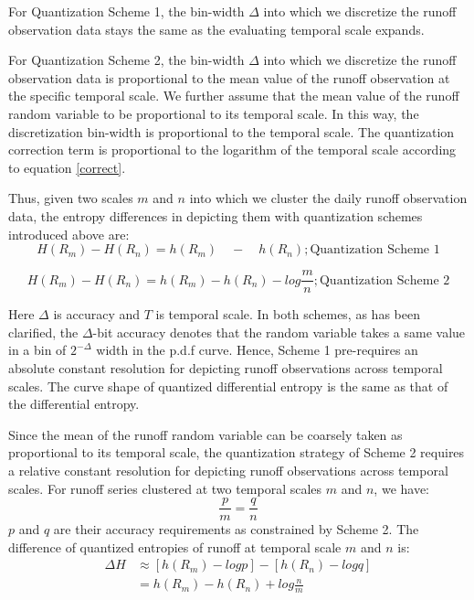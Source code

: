 \documentclass[draft,wrr]{AGUTeX}
\begin{document}
\begin{article}
For Quantization Scheme 1,  the bin-width $\Delta$ into which we discretize the runoff observation data stays the same as the evaluating temporal scale expands. 

For Quantization Scheme 2,  the bin-width $\Delta$ into which we discretize the runoff observation data is proportional to the mean value of the runoff observation at the specific temporal scale. We further assume that the mean value of the runoff random variable to be proportional to its temporal scale. In this way, the discretization bin-width is proportional to the temporal scale. The quantization correction term is proportional to the logarithm of the temporal scale according to equation \eqref{correct}.

Thus, given two scales $m$ and $n$ into which we cluster the daily runoff observation data, the entropy differences in depicting them with quantization schemes introduced above are:
\begin{equation}
\label{cquantization}
H(R_m)-H(R_n)=h(R_m)\quad-\quad h(R_n) ;\text{Quantization Scheme 1}
\end{equation}

\begin{equation}
\label{rquantization}
H(R_m)-H(R_n)=h(R_m)-h(R_n)-log\frac{m}{n} ;\text{Quantization Scheme 2} 
\end{equation} 


\iffalse
Here $\Delta$ is accuracy and $T$ is temporal scale.
In both schemes, as has been clarified, the $\Delta$-bit accuracy denotes that the random variable takes a same value in a bin of $2^{-\Delta}$ width in the p.d.f curve.  Hence, Scheme 1 pre-requires an absolute constant resolution for depicting runoff observations across temporal scales. The curve shape of quantized differential entropy is the same as that of the differential entropy. 

Since the mean of the runoff random variable can be coarsely taken as proportional to its temporal scale, the quantization strategy of Scheme 2 requires a relative constant resolution for depicting runoff observations across temporal scales. For runoff series clustered at two temporal scales $m$ and $n$, we have:
\begin{equation}
\frac{p}{m}=\frac{q}{n}
\end{equation}
$p$ and $q$ are their accuracy requirements as constrained by Scheme 2. The difference of  quantized entropies of runoff at temporal scale $m$ and $n$ is:
 \begin{equation}
\begin{split}
\Delta H &\approx [h(R_m)-logp]-[h(R_n)-logq]\\
&=h(R_m)-h(R_n)+log\frac{n}{m} 
\end{split}
\end{equation}


\end{article}
\end{document}
